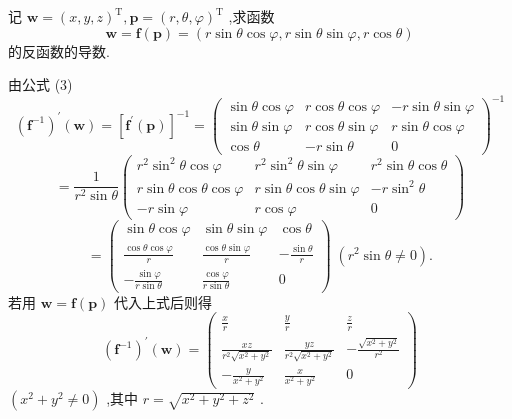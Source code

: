 \begin{example}

\end{example}
记 \(\mathbf{w} = {\left( x,y,z\right) }^{\mathrm{T}},\mathbf{p} = {\left( r,\theta ,\varphi \right) }^{\mathrm{T}}\) ,求函数
\[
\mathbf{w} = \mathbf{f}\left( \mathbf{p}\right)  = \left( {r\sin \theta \cos \varphi ,r\sin \theta \sin \varphi ,r\cos \theta }\right)  \tag{12}
\]
的反函数的导数.

\begin{solution}

\end{solution}
由公式 (3)
\[
{\left( {\mathbf{f}}^{-1}\right) }^{\prime }\left( \mathbf{w}\right)  = {\left\lbrack  {\mathbf{f}}^{\prime }\left( \mathbf{p}\right) \right\rbrack  }^{-1} = {\left( \begin{matrix} \sin \theta \cos \varphi & r\cos \theta \cos \varphi &  - r\sin \theta \sin \varphi \\  \sin \theta \sin \varphi & r\cos \theta \sin \varphi & r\sin \theta \cos \varphi \\  \cos \theta &  - r\sin \theta & 0 \end{matrix}\right) }^{-1}
\]
\[
= \frac{1}{{r}^{2}\sin \theta }\left( \begin{matrix} {r}^{2}{\sin }^{2}\theta \cos \varphi & {r}^{2}{\sin }^{2}\theta \sin \varphi & {r}^{2}\sin \theta \cos \theta \\  r\sin \theta \cos \theta \cos \varphi & r\sin \theta \cos \theta \sin \varphi &  - r{\sin }^{2}\theta \\   - r\sin \varphi & r\cos \varphi & 0 \end{matrix}\right)
\]
\[
= \left( \begin{matrix} \sin \theta \cos \varphi & \sin \theta \sin \varphi & \cos \theta \\  \frac{\cos \theta \cos \varphi }{r} & \frac{\cos \theta \sin \varphi }{r} &  - \frac{\sin \theta }{r} \\   - \frac{\sin \varphi }{r\sin \theta } & \frac{\cos \varphi }{r\sin \theta } & 0 \end{matrix}\right) \;\left( {{r}^{2}\sin \theta  \neq  0}\right) .
\]
若用 \(\mathbf{w} = \mathbf{f}\left( \mathbf{p}\right)\) 代入上式后则得
\[
{\left( {\mathbf{f}}^{-1}\right) }^{\prime }\left( \mathbf{w}\right)  = \left( \begin{matrix} \frac{x}{r} & \frac{y}{r} & \frac{z}{r} \\  \frac{xz}{{r}^{2}\sqrt{{x}^{2} + {y}^{2}}} & \frac{yz}{{r}^{2}\sqrt{{x}^{2} + {y}^{2}}} &  - \frac{\sqrt{{x}^{2} + {y}^{2}}}{{r}^{2}} \\   - \frac{y}{{x}^{2} + {y}^{2}} & \frac{x}{{x}^{2} + {y}^{2}} & 0 \end{matrix}\right)  \tag{13}
\]
\(\left( {{x}^{2} + {y}^{2} \neq  0}\right)\) ,其中 \(r = \sqrt{{x}^{2} + {y}^{2} + {z}^{2}}\) .

